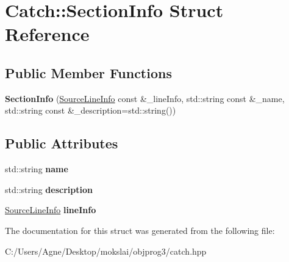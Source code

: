 \hypertarget{struct_catch_1_1_section_info}{}\section{Catch\+:\+:Section\+Info Struct Reference}
\label{struct_catch_1_1_section_info}
\subsection*{Public Member Functions}
\begin{DoxyCompactItemize}
\item 
\mbox{\label{struct_catch_1_1_section_info_a27aff3aaf8b6611f3651b17111a272c6}} 
{\bfseries Section\+Info} (\mbox{\hyperlink{struct_catch_1_1_source_line_info}{Source\+Line\+Info}} const \&\+\_\+line\+Info, std\+::string const \&\+\_\+name, std\+::string const \&\+\_\+description=std\+::string())
\end{DoxyCompactItemize}
\subsection*{Public Attributes}
\begin{DoxyCompactItemize}
\item 
\mbox{\label{struct_catch_1_1_section_info_a704c8fc662d309137e0d4f199cb7df58}} 
std\+::string {\bfseries name}
\item 
\mbox{\label{struct_catch_1_1_section_info_a0052060219a6de74bb7ade34d4163a4e}} 
std\+::string {\bfseries description}
\item 
\mbox{\label{struct_catch_1_1_section_info_adbc83b8a3507c4acc8ee249e93465711}} 
\mbox{\hyperlink{struct_catch_1_1_source_line_info}{Source\+Line\+Info}} {\bfseries line\+Info}
\end{DoxyCompactItemize}


The documentation for this struct was generated from the following file\+:\begin{DoxyCompactItemize}
\item 
C\+:/\+Users/\+Agne/\+Desktop/mokslai/objprog3/catch.\+hpp\end{DoxyCompactItemize}

